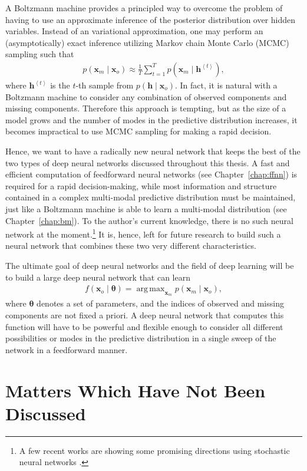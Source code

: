 \documentclass{now}
\newcommand{\qt}[1]{\left<#1\right>}
\newcommand{\vect}[1]{\mathbf{#1}}
\newcommand{\vects}[1]{\boldsymbol{#1}}
\newcommand{\vh}[0]{\vect{h}}
\newcommand{\vx}[0]{\vect{x}}
\newcommand{\TT}[0]{{\vects{\theta}}}
\DeclareMathOperator*{\argmax}{arg\,max}
\begin{document}
A Boltzmann machine provides a principled way to overcome
the problem of having to use an approximate inference of the
posterior distribution over hidden variables. Instead of an
variational approximation, one may perform an
(asymptotically) exact inference utilizing Markov chain
Monte Carlo (MCMC) sampling such that
\begin{align*}
    p(\vx_m \mid \vx_o) \approx \frac{1}{T} \sum_{t=1}^T
    p(\vx_m \mid \vh^{\qt{t}}),
\end{align*}
where $\vh^{\qt{t}}$ is the $t$-th sample from $p(\vh \mid
\vx_o)$. In fact, it is natural with a Boltzmann machine to
consider any combination of observed components and missing
components. Therefore this approach is tempting, but as the
size of a model grows and the number of modes in the
predictive distribution increases, it becomes impractical to
use MCMC sampling for making a rapid decision.

Hence, we want to have a radically new neural network that
keeps the best of the two types of deep neural networks
discussed throughout this thesis. A fast and efficient
computation of feedforward neural networks (see
Chapter~\ref{chap:ffnn}) is required for a rapid
decision-making, while most information and structure
contained in a complex multi-modal predictive distribution
must be maintained, just like a Boltzmann machine is able to
learn a multi-modal distribution (see
Chapter~\ref{chap:bm}). To the author's current knowledge,
there is no such neural network at the moment.\footnote{
A few recent works are showing some promising directions using
stochastic neural networks \citet[see,
e.g.,][]{Bengio2013gsn,Tang2013}.} It is, hence, left for
future research to build such a neural network that combines these
two very different characteristics.

The ultimate goal of deep neural networks and the field of
deep learning will be to build a large deep neural network
that can learn
\begin{align*}
    f(\vx_o\mid \TT) = \argmax_{\vx_m} p(\vx_m \mid \vx_o),
\end{align*}
where $\TT$ denotes a set of parameters, and the indices of
observed and missing components are not fixed a priori. A
deep neural network that computes this function will have to
be powerful and flexible enough to consider all different
possibilities or modes in the predictive distribution in a
single sweep of the network in a feedforward manner.



\section{Matters Which Have Not Been Discussed}
\label{sec:leftovers}
\end{document}
